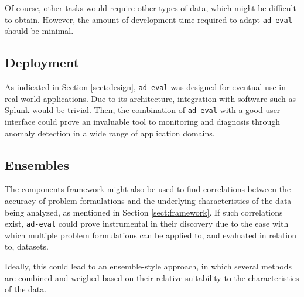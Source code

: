 Of course, other tasks would require other types of data, which might be difficult to obtain. However, the amount of development time required to adapt \texttt{ad-eval} should be minimal.

\subsection{Deployment}

As indicated in Section \ref{sect:design}, \texttt{ad-eval} was designed for eventual use in real-world applications. Due to its architecture, integration with software such as Splunk would be trivial. Then, the combination of \texttt{ad-eval} with a good user interface could prove an invaluable tool to monitoring and diagnosis through anomaly detection in a wide range of application domains. 

\subsection{Ensembles}

The components framework might also be used to find correlations between the accuracy of problem formulations and the underlying characteristics of the data being analyzed, as mentioned in Section \ref{sect:framework}. If such correlations exist, \texttt{ad-eval} could prove instrumental in their discovery due to the ease with which multiple problem formulations can be applied to, and evaluated in relation to, datasets.

Ideally, this could lead to an ensemble-style approach, in which several methods are combined and weighed based on their relative suitability to the characteristics of the data.
